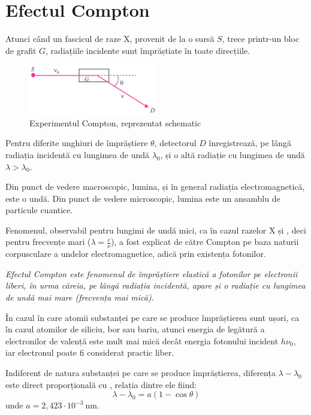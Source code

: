 \section{Efectul Compton}

Atunci când un fascicul de raze X, provenit de la o sursă $S$, trece printr-un
bloc de grafit $G$, radiațiile incidente sunt împrăștiate în toate direcțiile.

\begin{figure}
    \includegraphics[width=0.5\textwidth]{fig/compton}
    \caption{Experimentul Compton, reprezentat schematic}
\end{figure}

Pentru diferite unghiuri de împrăștiere $\theta$, detectorul $D$ înregistrează,
pe lângă radiația incidentă cu lungimea de undă $\lambda_0$, și o altă radiație
cu lungimea de undă \( \lambda > \lambda_0 \).

Din punct de vedere macroscopic, lumina, și în general radiația electromagnetică,
este o undă. Din punct de vedere microscopic, lumina este un ansamblu de particule
cuantice.

\parbreak

Fenomenul, observabil pentru lungimi de undă mici, ca în cazul razelor X și
\gamma, deci pentru frecvențe mari (\(\lambda = \frac{c}{\nu} \)), a fost
explicat de către Compton pe baza naturii corpusculare a undelor electromagnetice,
adică prin existența fotonilor.

\emph{%
    Efectul Compton este fenomenul de împrăștiere elastică a fotonilor pe
    electronii liberi, în urma căreia, pe lângă radiația incidentă, apare și
    o radiație cu lungimea de undă mai mare (frecvența mai mică).
}

În cazul în care atomii substanței pe care se produce împrăștierea sunt ușori,
ca în cazul atomilor de siliciu, bor sau bariu, atunci energia de legătură a
electronilor de valență este mult mai mică decât energia fotonului incident
$h\nu_0$, iar electronul poate fi considerat practic liber.

Indiferent de natura substanței pe care se produce împrăștierea, diferența
\( \lambda - \lambda_0 \) este direct proporțională cu \theta, relația dintre
ele fiind:
\[ \lambda - \lambda_0 = a(1 - \cos\theta) \]
unde \( a = 2,423 \cdot 10^{-3} ~ \mathrm{nm} \).


